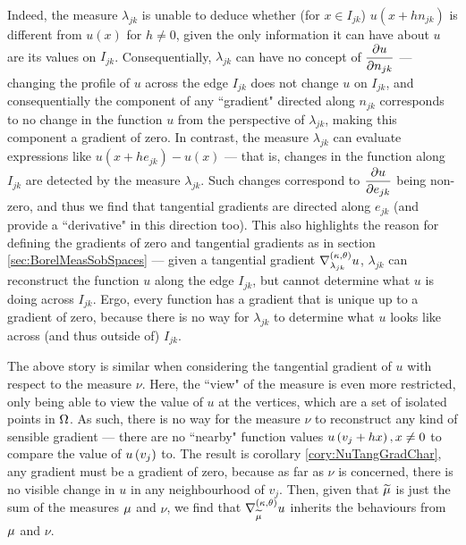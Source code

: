 Indeed, the measure $\lambda_{jk}$ is unable to deduce whether (for $x\in I_{jk}$) $u(x+hn_{jk})$ is different from $u(x)$ for $h\neq0$, given the only information it can have about $u$ are its values on $I_{jk}$.
Consequentially, $\lambda_{jk}$ can have no concept of $\dfrac{\partial u}{\partial n_{jk}}$ --- changing the profile of $u$ across the edge $I_{jk}$ does not change $u$ on $I_{jk}$, and consequentially the component of any ``gradient" directed along $n_{jk}$ corresponds to no change in the function $u$ from the perspective of $\lambda_{jk}$, making this component a gradient of zero.
In contrast, the measure $\lambda_{jk}$ can evaluate expressions like $u(x+he_{jk})-u(x)$ --- that is, changes in the function along $I_{jk}$ are detected by the measure $\lambda_{jk}$.
Such changes correspond to $\dfrac{\partial u}{\partial e_{jk}}$ being non-zero, and thus we find that tangential gradients are directed along $e_{jk}$ (and provide a ``derivative" in this direction too).
This also highlights the reason for defining the gradients of zero and tangential gradients as in section \ref{sec:BorelMeasSobSpaces} --- given a tangential gradient $\nabla^{\left( \kappa, \theta \right)}_{\lambda_{jk}}u$, $\lambda_{jk}$ can reconstruct the function $u$ along the edge $I_{jk}$, but cannot determine what $u$ is doing across $I_{jk}$.
Ergo, every function has a gradient that is unique up to a gradient of zero, because there is no way for $\lambda_{jk}$ to determine what $u$ looks like across (and thus outside of) $I_{jk}$.

The above story is similar when considering the tangential gradient of $u$ with respect to the measure $\nu$.
Here, the ``view" of the measure is even more restricted, only being able to view the value of $u$ at the vertices, which are a set of isolated points in $\Omega$.
As such, there is no way for the measure $\nu$ to reconstruct any kind of sensible gradient --- there are no ``nearby" function values $u\left( v_j + h x \right), x\neq 0$ to compare the value of $u\left( v_j \right)$ to.
The result is corollary \ref{cory:NuTangGradChar}, any gradient must be a gradient of zero, because as far as $\nu$ is concerned, there is no visible change in $u$ in any neighbourhood of $v_j$.
Then, given that $\widetilde{\mu}$  is just the sum of the measures $\mu$ and $\nu$, we find that $\nabla^{\left( \kappa, \theta \right)}_{\widetilde{\mu}}u$ inherits the behaviours from $\mu$ and $\nu$.